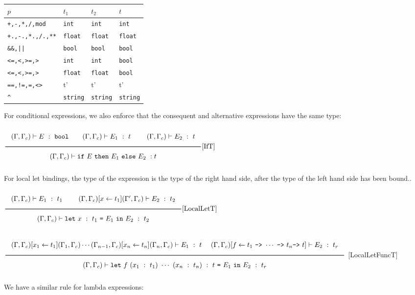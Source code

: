\documentclass[a4paper]{article}
\newcommand{\Rule}[2]{\genfrac{}{}{0.7pt}{}{{\setlength{\fboxrule}{0pt}\setlength{\fboxsep}{3mm}\fbox{$#1$}}}{{\setlength{\fboxrule}{0pt}\setlength{\fboxsep}{3mm}\fbox{$#2$}}}}
\newcommand{\RuleWithName}[3]{\genfrac{}{}{0.7pt}{}{{\setlength{\fboxrule}{0pt}\setlength{\fboxsep}{3mm}\fbox{$#1$}}}{{\setlength{\fboxrule}{0pt}\setlength{\fboxsep}{3mm}\fbox{$#2$}}}[\text{#3}]}
\newcommand{\Int}{\texttt{int}}
\newcommand{\Float}{\texttt{float}}
\newcommand{\String}{\texttt{string}}
\newcommand{\Bool}{\texttt{bool}}
\begin{document}
\begin{tabular}{|l||l|l|l|} \hline
    $p$ & $t_1$ & $t_2$ & $t$ \\ \hline \hline
    \verb#+,-,*,/,mod# & \Int & \Int & \Int \\ \hline
    \verb#+.,-.,*.,/.,**# & \Float & \Float & \Float \\ \hline
    \verb#&&,||#  & \Bool & \Bool & \Bool \\ \hline
    \verb#<=,<,>=,># & \Int & \Int & \Bool \\ \hline
    \verb#<=,<,>=,># & \Float & \Float & \Bool \\ \hline
    \verb#==,!=,=,<># & t' & t' & t' \\ \hline
    \verb#^# & \String & \String & \String \\ \hline
\end{tabular}
\vspace{3mm}

For conditional expressions, we also enforce that the consequent and alternative expressions have the same type:

\begin{center}
    $\RuleWithName{(\Gamma, \Gamma_c) \vdash E\ :\ \Bool \qquad (\Gamma, \Gamma_c) \vdash E_1\ :\ t\ \qquad (\Gamma, \Gamma_c) \vdash E_2\ :\ t}{(\Gamma, \Gamma_c) \vdash \texttt{if}\ E\ \texttt{then}\ E_1\ \texttt{else}\ E_2\ : t}{IfT}$
\end{center}

For local let bindings, the type of the expression is the type of the right hand side, after the type of the left hand side has been bound..

\begin{center}
    $\RuleWithName{(\Gamma, \Gamma_c) \vdash E_1\ :\ t_1\ \qquad (\Gamma, \Gamma_c) [x \leftarrow t_1](\Gamma', \Gamma_c) \vdash E_2\ :\ t_2}{(\Gamma, \Gamma_c) \vdash \texttt{let}\ x\ :\ t_1\ \texttt{=}\ E_1\ \texttt{in}\ E_2\ :\ t_2}{LocalLetT}$

    $\Rule{(\Gamma, \Gamma_c) [x_1 \leftarrow t_1] (\Gamma_1, \Gamma_c) \cdots (\Gamma_{n-1}, \Gamma_c) [x_n \leftarrow t_n] (\Gamma_n, \Gamma_c) \vdash E_1\ :\ t\ \quad (\Gamma, \Gamma_c) [f \leftarrow t_1\ \texttt{->}\ \cdots\ \texttt{->}\ t_n \texttt{->}\ t] \vdash E_2\ :\ t_r}
    {(\Gamma, \Gamma_c) \vdash \texttt{let}\ f\ (x_1\ :\ t_1)\ \cdots\ (x_n\ :\ t_n)\ :\ t\ \texttt{=}\ E_1\ \texttt{in}\ E_2\ :\ t_r}$
    [LocalLetFuncT]
\end{center}


We have a similar rule for lambda expressions:
\end{document}
